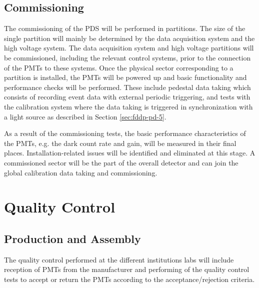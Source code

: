 \subsection{Commissioning}
\label{sec:fddp-pd-9.4}

The commissioning of the PDS will be performed in partitions. The size of the single partition will mainly be determined by the data acquisition system and the high voltage system. The data acquisition system and high voltage partitions will be commissioned, including the relevant control systems, prior to the connection of the PMTs to these systems. Once the physical sector corresponding to a partition is installed, the PMTs will be powered up and basic functionality and performance checks will be performed. These include pedestal data taking which consists of recording event data with external periodic triggering, and tests with the calibration system where the data taking is triggered in synchronization with a light source as described in Section \ref{sec:fddp-pd-5}.

As a result of the commissioning tests, the basic performance characteristics of the PMTs, e.g. the dark count rate and gain, will be measured in their final places. Installation-related issues will be identified and eliminated at this stage. A commissioned sector will be the part of the overall detector and can join the global calibration data taking and commissioning.

\section{Quality Control}
\label{sec:fddp-pd-10}

 \subsection{Production and Assembly}
 \label{sec:fddp-pd-10.1}
 
The quality control performed at the different institutions labs will include reception of PMTs from the manufacturer and performing of the quality control tests to accept or return the PMTs according to the acceptance/rejection criteria.

